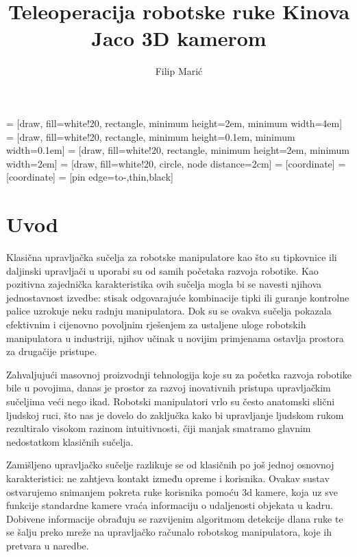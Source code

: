 \documentclass[times, utf8, diplomski, numeric]{fer}
\begin{document}
 = [draw, fill=white!20, rectangle, 
    minimum height=2em, minimum width=4em]
 = [draw, fill=white!20, rectangle, 
    minimum height=0.1em, minimum width=0.1em]    
 = [draw, fill=white!20, rectangle, 
    minimum height=2em, minimum width=2em]
 = [draw, fill=white!20, circle, node distance=2cm]
 = [coordinate]
 = [coordinate]
 = [pin edge={to-,thin,black}]


\title{Teleoperacija robotske ruke Kinova Jaco 3D kamerom}

\author{Filip Marić}

\maketitle

\zahvala{}

\tableofcontents

\chapter{Uvod}
Klasična upravljačka sučelja za robotske manipulatore kao što su tipkovnice ili daljinski upravljači u uporabi su od samih početaka razvoja robotike.
Kao pozitivna zajednička karakteristika ovih sučelja mogla bi se navesti njihova jednostavnost izvedbe: stisak odgovarajuće kombinacije tipki ili guranje kontrolne palice uzrokuje neku radnju manipulatora.
Dok su se ovakva sučelja pokazala efektivnim i cijenovno povoljnim rješenjem za ustaljene uloge robotskih manipulatora u industriji, njihov učinak u novijim primjenama ostavlja prostora za drugačije pristupe.

Zahvaljujući masovnoj proizvodnji tehnologija koje su za početka razvoja robotike bile u povojima, danas je prostor za razvoj inovativnih pristupa upravljačkim sučeljima veći nego ikad.
Robotski manipulatori vrlo su često anatomski slični ljudskoj ruci, što nas je dovelo do zaključka kako bi upravljanje ljudskom rukom rezultiralo visokom razinom intuitivnosti, čiji manjak smatramo glavnim nedostatkom klasičnih sučelja.

Zamišljeno upravljačko sučelje razlikuje se od klasičnih po još jednoj osnovnoj karakteristici: ne zahtjeva kontakt između opreme i korisnika.
Ovakav sustav ostvarujemo snimanjem pokreta ruke korisnika pomoću 3d kamere, koja uz sve funkcije standardne kamere vraća informaciju o udaljenosti objekata u kadru.
Dobivene informacije obrađuju se razvijenim algoritmom detekcije dlana ruke te se šalju preko mreže na upravljačko računalo robotskog manipulatora, koje ih pretvara u naredbe.
\end{document}
